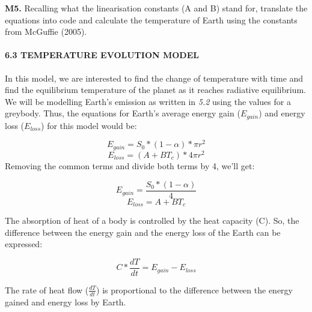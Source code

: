 \documentclass[
  letterpaper,
  DIV=11,
  numbers=noendperiod]{scrartcl}
\let\oldparagraph\paragraph
\renewcommand{\paragraph}[1]{\oldparagraph{#1}\mbox{}}
\begin{document}
\begin{tcolorbox}[enhanced jigsaw, titlerule=0mm, title={Modelling Questions}, arc=.35mm, breakable, colback=white, toprule=.15mm, colframe=quarto-callout-caution-color-frame, opacityback=0, bottomtitle=1mm, coltitle=black, toptitle=1mm, rightrule=.15mm, colbacktitle=quarto-callout-caution-color!10!white, bottomrule=.15mm, opacitybacktitle=0.6, leftrule=.75mm, left=2mm]

\textbf{M5.} Recalling what the linearisation constants (A and B) stand
for, translate the equations into code and calculate the temperature of
Earth using the constants from McGuffie (2005).

\end{tcolorbox}

\hypertarget{temperature-evolution-model-1}{%
\paragraph{6.3 TEMPERATURE EVOLUTION
MODEL}\label{temperature-evolution-model-1}}

In this model, we are interested to find the change of temperature with
time and find the equilibrium temperature of the planet as it reaches
radiative equilibrium. We will be modelling Earth's emission as written
in \emph{5.2} using the values for a greybody. Thus, the equations for
Earth's average energy gain (\(E_{gain}\)) and energy loss
(\(E_{loss}\)) for this model would be:

\[E_{gain} = S_0* (1-\alpha)*\pi r^2\]
\[E_{loss} = (A + BT_c) * 4\pi r^2\] Removing the common terms and
divide both terms by 4, we'll get:

\[E_{gain} = \frac{S_0* (1-\alpha)}{4}\] \[E_{loss} = A + BT_c\]

The absorption of heat of a body is controlled by the heat capacity (C).
So, the difference between the energy gain and the energy loss of the
Earth can be expressed:

\begin{equation}
\tag{7}
C * \frac{dT}{dt} = E_{gain} - E_{loss}
\end{equation}

The rate of heat flow (\(\frac{dT}{dt}\)) is proportional to the
difference between the energy gained and energy loss by Earth.
\end{document}
